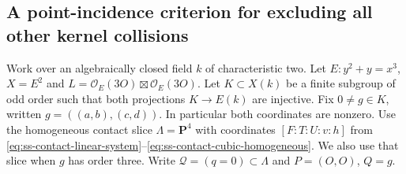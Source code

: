\subsection{A point-incidence criterion for excluding all other kernel collisions}
\label{subsec:ss-uniform-collision-exclusion}

Work over an algebraically closed field $k$ of characteristic two.
Let $E:y^2+y=x^3$, $X=E^2$ and
$L=\mathcal O_E(3O)\boxtimes\mathcal O_E(3O)$.
Let $K\subset X(k)$ be a finite subgroup of odd order such that both
projections $K\to E(k)$ are injective. Fix $0\ne g\in K$, written
$g=((a,b),(c,d))$. In particular both coordinates are nonzero.
Use the homogeneous contact slice $\Lambda=\mathbf P^4$ with coordinates
$[F:T:U:v:h]$ from
\eqref{eq:ss-contact-linear-system}--\eqref{eq:ss-contact-cubic-homogeneous}.
We also use that slice when $g$ has order three. Write
$\mathcal Q=(q=0)\subset\Lambda$ and $P=(O,O)$, $Q=g$.

